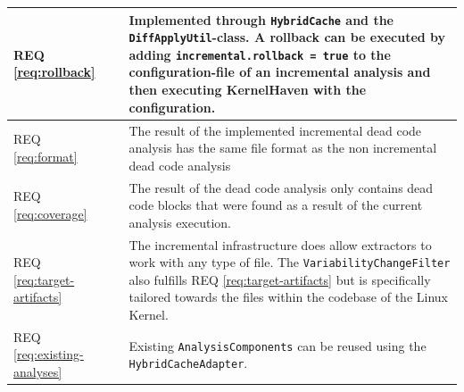 \documentclass[a4paper]{article}
\newcommand{\cmark}{\ding{51}}%
\begin{document}
\begin{longtable}{ |  L{0.19\textwidth} | C{0.125\textwidth} | L{0.60\textwidth} |}
	REQ \ref{req:rollback} & \cmark & Implemented through \texttt{Hybrid\-Cache} and the \texttt{DiffApplyUtil}-class. A rollback can be executed by adding \texttt{incremental.rollback = true} to the configuration-file of an incremental analysis and then executing KernelHaven with the configuration. \\ \hline
	REQ \ref{req:format} & \cmark & The result of the implemented incremental dead code analysis has the same file format as the non incremental dead code analysis\\ \hline
	REQ \ref{req:coverage} & \cmark & The result of the dead code analysis only contains dead code blocks that were found as a result of the current analysis execution.\\ \hline
	REQ \ref{req:target-artifacts} & \cmark & The incremental infrastructure does allow extractors to work with any type of file. The \texttt{VariabilityChangeFilter} also fulfills REQ \ref{req:target-artifacts}  but is specifically tailored towards the files within the codebase of the Linux Kernel.\\ \hline
	REQ \ref{req:existing-analyses} & \cmark & Existing \texttt{AnalysisComponents}  can be reused using the \texttt{Hybrid\-Cache\-Adapter}.\\ \hline

\end{longtable}
\end{document}
